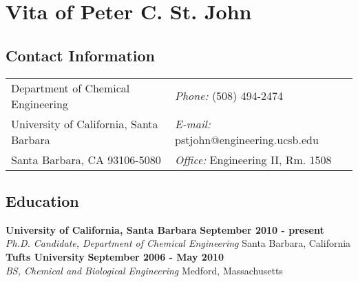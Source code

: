 {
\singlespace
\setlength{\parindent}{0em}
\setlength{\parskip}{1em}

\section*{Vita of Peter C. St. John}

\subsection*{Contact Information}
\vspace{.05in}
\begin{tabular}{@{}p{3.5in}p{4in}}
Department of Chemical Engineering   & {\it Phone:}  (508) 494-2474\\             
University of California, Santa Barbara & {\it E-mail:} pstjohn@engineering.ucsb.edu\\       
Santa Barbara, CA 93106-5080 & {\it Office:} Engineering II, Rm. 1508\\
\end{tabular}


\subsection*{Education}
  {\bf University of California, Santa Barbara} \hfill {\bf September 2010 - present} \\
  {\em Ph.D. Candidate, Department of Chemical Engineering} \hfill Santa Barbara,
  California \\[-3ex]

  {\bf Tufts University}  \hfill {\bf September 2006 - May 2010}\\
  {\em BS, Chemical and Biological Engineering} \hfill Medford,
  Massachusetts\\[-3ex]

}
